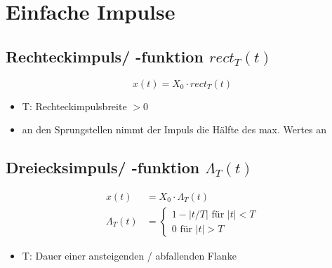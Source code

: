 \section{Einfache Impulse}
\subsection*{Rechteckimpuls/ -funktion \texorpdfstring{$rect_T\left(t\right)$}{}}
\begin{multicols}{2}
\begin{equation*}
x\left(t\right) = X_0 \cdot rect_T\left(t\right) 
\end{equation*}

\begin{itemize}
 \item T: Rechteckimpulsbreite \(> 0\)
 \item an den Sprungstellen nimmt der Impuls die Hälfte des max. Wertes an
\end{itemize}

\begin{center}
 
\end{center}

\end{multicols}

\subsection*{Dreiecksimpuls/ -funktion \texorpdfstring{$\Lambda_T\left(t\right)$}{}}
\begin{multicols}{2}
 \begin{align*}
x\left(t\right) &= X_0 \cdot \Lambda_T\left(t\right) \\
\Lambda_T\left(t\right) &=\begin{cases}
1-\left|t/T\right| \text{ für } \left|t\right| < T\\
0 \text{ für } \left|t\right| > T
\end{cases}
\end{align*}

\begin{itemize}
 \item T: Dauer einer ansteigenden / abfallenden Flanke
\end{itemize}

\begin{center}
 
\end{center}

\end{multicols}

